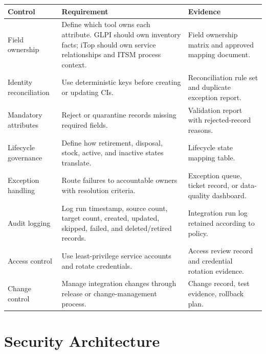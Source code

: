 \documentclass[11pt]{article}
\begin{document}
\begin{longtable}{>{\raggedright\arraybackslash}p{\dimexpr 0.24444\dimexpr\linewidth-6\tabcolsep\relax\relax}>{\raggedright\arraybackslash}p{\dimexpr 0.41111\dimexpr\linewidth-6\tabcolsep\relax\relax}>{\raggedright\arraybackslash}p{\dimexpr 0.34444\dimexpr\linewidth-6\tabcolsep\relax\relax}}
\toprule
\rowcolor{LightBlue}\textbf{Control} & \textbf{Requirement} & \textbf{Evidence} \\
\midrule
Field ownership & Define which tool owns each attribute. GLPI should own inventory facts; iTop should own service relationships and ITSM process context. & Field ownership matrix and approved mapping document. \\
Identity reconciliation & Use deterministic keys before creating or updating CIs. & Reconciliation rule set and duplicate exception report. \\
Mandatory attributes & Reject or quarantine records missing required fields. & Validation report with rejected-record reasons. \\
Lifecycle governance & Define how retirement, disposal, stock, active, and inactive states translate. & Lifecycle state mapping table. \\
Exception handling & Route failures to accountable owners with resolution criteria. & Exception queue, ticket record, or data-quality dashboard. \\
Audit logging & Log run timestamp, source count, target count, created, updated, skipped, failed, and deleted/retired records. & Integration run log retained according to policy. \\
Access control & Use least-privilege service accounts and rotate credentials. & Access review record and credential rotation evidence. \\
Change control & Manage integration changes through release or change-management process. & Change record, test evidence, rollback plan. \\
\bottomrule
\end{longtable}

\section{Security Architecture}
\end{document}
